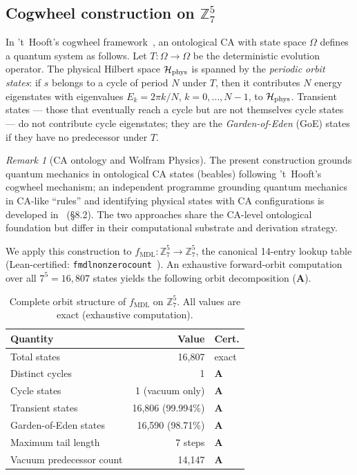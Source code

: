 \documentclass[11pt]{article}
\theoremstyle{remark}
\newtheorem{remark}[theorem]{Remark}
\newcommand{\MDL}{\text{MDL}}
\newcommand{\lean}[1]{%
  \penalty-100
  \begingroup\def\_{\textunderscore\allowbreak}\texttt{#1}\endgroup}
\newcommand{\CatA}{\textbf{A}}
\newcommand{\Hil}{\mathcal{H}}
\begin{document}
\subsection{Cogwheel construction on \texorpdfstring{$\mathbb{Z}_7^5$}{Z75}}
\label{ssec:cogwheel}

In 't~Hooft's cogwheel framework~\cite{tHooft2016CA}, an ontological
CA with state space $\Omega$ defines a quantum system as follows.
Let $T:\Omega\to\Omega$ be the deterministic evolution operator.
The physical Hilbert space $\Hil_{\rm phys}$ is spanned by the
\emph{periodic orbit states}: if $s$ belongs to a cycle of period $N$
under $T$, then it contributes $N$ energy eigenstates with eigenvalues
$E_k = 2\pi k/N$, $k=0,\ldots,N-1$, to $\Hil_{\rm phys}$.
Transient states --- those that eventually reach a cycle but are not
themselves cycle states --- do not contribute cycle eigenstates; they
are the \emph{Garden-of-Eden} (GoE) states if they have no predecessor
under $T$.

\begin{remark}[CA ontology and Wolfram Physics]\label{rem:wolfram_beable}
The present construction grounds quantum mechanics in ontological CA
states (beables) following 't~Hooft's cogwheel mechanism; an
independent programme grounding quantum mechanics in CA-like ``rules''
and identifying physical states with CA configurations is developed
in~\cite{Wolfram2020Tech} (\S8.2).
The two approaches share the CA-level ontological foundation but
differ in their computational substrate and derivation strategy.
\end{remark}

We apply this construction to $f_{\MDL}:\mathbb{Z}_7^5\to\mathbb{Z}_7^5$,
the canonical 14-entry lookup table (Lean-certified:
\lean{fmdl\_nonzero\_count\_14}~\cite{SpivackCompUniversality}).
An exhaustive forward-orbit computation over all $7^5 = 16{,}807$
states yields the following orbit decomposition (\CatA{}).

\begin{table}[h!]
\centering
\caption{Complete orbit structure of $f_{\MDL}$ on $\mathbb{Z}_7^5$.
All values are exact (exhaustive computation).}
\label{tab:orbit}
\begin{tabular}{lrl}
\toprule
Quantity & Value & Cert.\\
\midrule
Total states & 16{,}807 & exact \\
Distinct cycles & 1 & \CatA{} \\
Cycle states & 1 (vacuum only) & \CatA{} \\
Transient states & 16{,}806 (99.994\%) & \CatA{} \\
Garden-of-Eden states & 16{,}590 (98.71\%) & \CatA{} \\
Maximum tail length & 7 steps & \CatA{} \\
Vacuum predecessor count & 14{,}147 & \CatA{} \\
\bottomrule
\end{tabular}
\end{table}
\end{document}

